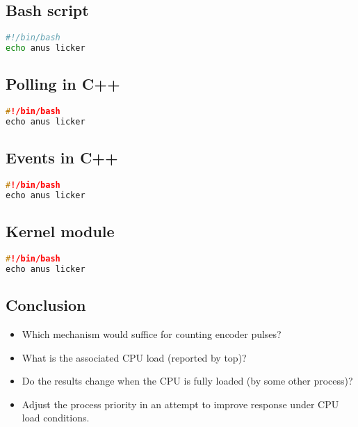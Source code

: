 \documentclass{article}
\begin{document}
\subsection*{Bash script}\label{sub:Bash script} %
\begin{lstlisting}[language=bash,caption={Shell script},label=lst:shell-script]
#!/bin/bash
echo anus licker
\end{lstlisting}


\subsection*{Polling in C++}\label{sub:Polling in C++} %
\begin{lstlisting}[language=c++,caption={C++ application polling pin status using gpiod},label=lst:cpp-polling]
#!/bin/bash
echo anus licker
\end{lstlisting}


\subsection*{Events in C++}\label{sub:Events in C++} %
\begin{lstlisting}[language=c++,caption={C++ application reading pins using
events},label=lst:cpp-events]
#!/bin/bash
echo anus licker
\end{lstlisting}


\subsection*{Kernel module}\label{sub:Kernel module} %
\begin{lstlisting}[language=c,caption={Kernel module},label=lst:kernel-module]
#!/bin/bash
echo anus licker
\end{lstlisting}


\subsection*{Conclusion}


\begin{itemize}
    \item Which mechanism would suffice for counting encoder pulses?
    \item What is the associated CPU load (reported by top)?
    \item Do the results change when the CPU is fully loaded (by some other process)?
    \item Adjust the process priority in an attempt to improve response under CPU load conditions.
\end{itemize}
\end{document}
